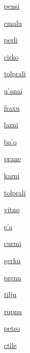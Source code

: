 {\hyperlink{val:pensi}{pensi}}{}{}{}

{\hyperlink{val:cmalu}{cmalu}}{}{}{}

{\hyperlink{val:perli}{perli}}{}{}{}

{\hyperlink{val:cirko}{cirko}}{}{}{}

{\hyperlink{val:tolprali}{tolprali}}{}{}{}

{\hyperlink{val:uhanai}{u'anai}}{}{}{}

{\hyperlink{val:fraxu}{fraxu}}{}{}{}

{\hyperlink{val:lazni}{lazni}}{}{}{}

{\hyperlink{val:baho}{ba'o}}{}{}{}

{\hyperlink{val:prane}{prane}}{}{}{}

{\hyperlink{val:karni}{karni}}{}{}{}

{\hyperlink{val:tolprali}{tolprali}}{}{}{}

{\hyperlink{val:vitno}{vitno}}{}{}{}

{\hyperlink{val:eha}{e'a}}{}{}{}

{\hyperlink{val:curmi}{curmi}}{}{}{}

{\hyperlink{val:gerku}{gerku}}{}{}{}

{\hyperlink{val:prenu}{prenu}}{}{}{}

{\hyperlink{val:tilju}{tilju}}{}{}{}

{\hyperlink{val:rupnu}{rupnu}}{}{}{}

{\hyperlink{val:petso}{petso}}{}{}{}

{\hyperlink{val:ctile}{ctile}}{}{}{}

{\hyperlink{val:finpe}{finpe}}{}{}{}

{\hyperlink{val:sufti}{sufti}}{}{}{}

{\hyperlink{val:pai}{pai}}{}{}{}

{\hyperlink{val:pipno}{pipno}}{}{}{}

